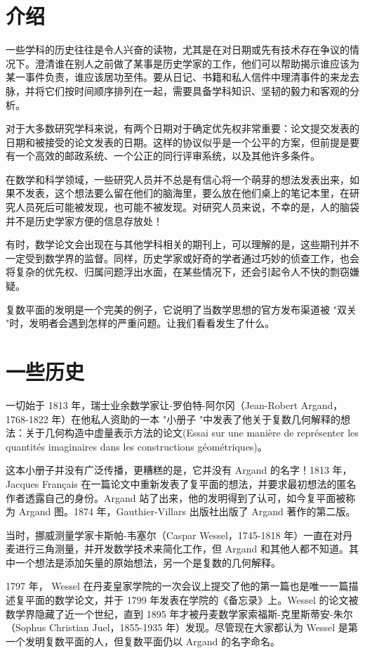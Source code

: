 \section{介绍}
一些学科的历史往往是令人兴奋的读物，尤其是在对日期或先有技术存在争议的情况下。澄清谁在别人之前做了某事是历史学家的工作，他们可以帮助揭示谁应该为某一事件负责，谁应该居功至伟。要从日记、书籍和私人信件中理清事件的来龙去脉，并将它们按时间顺序排列在一起，需要具备学科知识、坚韧的毅力和客观的分析。

对于大多数研究学科来说，有两个日期对于确定优先权非常重要：论文提交发表的日期和被接受的论文发表的日期。这样的协议似乎是一个公平的方案，但前提是要有一个高效的邮政系统、一个公正的同行评审系统，以及其他许多条件。

在数学和科学领域，一些研究人员并不总是有信心将一个萌芽的想法发表出来，如果不发表，这个想法要么留在他们的脑海里，要么放在他们桌上的笔记本里，在研究人员死后可能被发现，也可能不被发现。对研究人员来说，不幸的是，人的脑袋并不是历史学家方便的信息存放处！

有时，数学论文会出现在与其他学科相关的期刊上，可以理解的是，这些期刊并不一定受到数学界的监督。同样，历史学家或好奇的学者通过巧妙的侦查工作，也会将复杂的优先权、归属问题浮出水面，在某些情况下，还会引起令人不快的剽窃嫌疑。

复数平面的发明是一个完美的例子，它说明了当数学思想的官方发布渠道被 "双关 "时，发明者会遇到怎样的严重问题。让我们看看发生了什么。

\section{一些历史}
一切始于 1813 年，瑞士业余数学家让-罗伯特-阿尔冈（Jean-Robert Argand，1768-1822 年）在他私人资助的一本 "小册子 "中发表了他关于复数几何解释的想法：关于几何构造中虚量表示方法的论文(Essai sur une manière de représenter les quantités imaginaires dans les constructions géométriques)\cite{bib4-1}。

这本小册子并没有广泛传播，更糟糕的是，它并没有 Argand 的名字！1813 年，Jacques Français 在一篇论文中重新发表了复平面的想法，并要求最初想法的匿名作者透露自己的身份。Argand 站了出来，他的发明得到了认可，如今复平面被称为 Argand 图。1874 年，Gauthier-Villars 出版社出版了 Argand 著作的第二版\cite{bib4-2}。

当时，挪威测量学家卡斯帕-韦塞尔（Caspar Wessel，1745-1818 年）一直在对丹麦进行三角测量，并开发数学技术来简化工作，但 Argand 和其他人都不知道。其中一个想法是添加矢量的原始想法，另一个是复数的几何解释。

1797 年， Wessel 在丹麦皇家学院的一次会议上提交了他的第一篇也是唯一一篇描述复平面的数学论文，并于 1799 年发表在学院的《备忘录》上。Wessel 的论文被数学界隐藏了近一个世纪，直到 1895 年才被丹麦数学家索福斯-克里斯蒂安-朱尔（Sophus Christian Juel，1855-1935 年）发现。尽管现在大家都认为 Wessel 是第一个发明复数平面的人，但复数平面仍以 Argand 的名字命名。

